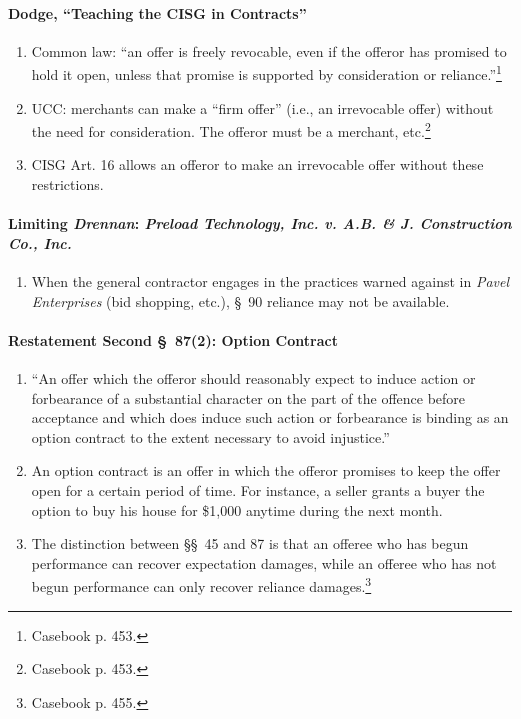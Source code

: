 \paragraph{Dodge, ``Teaching the CISG in Contracts''}

\begin{enumerate}
    \item Common law: ``an offer is freely revocable, even if the offeror has 
    promised to hold it open, unless that promise is supported by 
    consideration or reliance.''\footnote{Casebook p. 453.}
    \item UCC: merchants can make a ``firm offer'' (i.e., an irrevocable 
    offer) without the need for consideration. The offeror must be a merchant, 
    etc.\footnote{Casebook p. 453.}
    \item CISG Art. 16 allows an offeror to make an irrevocable offer without 
    these restrictions.
\end{enumerate}


\paragraph{Limiting \emph{Drennan}: \emph{Preload Technology, Inc. v. A.B. \& 
J. Construction Co., Inc.}}

\begin{enumerate}
    \item When the general contractor engages in the practices warned against 
    in \emph{Pavel Enterprises} (bid shopping, etc.), \S\ 90 reliance may not 
    be available.
\end{enumerate}

\paragraph{Restatement Second \S\ 87(2): Option Contract}

\begin{enumerate}
    \item ``An offer which the offeror should reasonably expect to induce 
    action or forbearance of a substantial character on the part of the 
    offence before acceptance and which does induce such action or forbearance 
    is binding as an option contract to the extent necessary to avoid 
    injustice.''
    \item An option contract is an offer in which the offeror promises to keep 
    the offer open for a certain period of time. For instance, a seller grants 
    a buyer the option to buy his house for \$1,000 anytime during the next 
    month.
    \item The distinction between \S\S\ 45 and 87 is that an offeree who has 
    begun performance can recover expectation damages, while an offeree who 
    has not begun performance can only recover reliance 
    damages.\footnote{Casebook p. 455.}
\end{enumerate}

